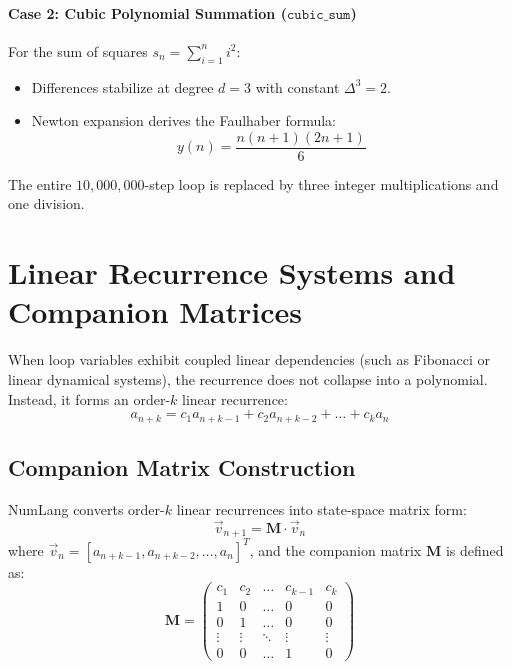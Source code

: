\paragraph{Case 2: Cubic Polynomial Summation ($\mathtt{cubic\_sum}$)}
For the sum of squares $s_n = \sum_{i=1}^n i^2$:
\begin{itemize}
    \item Differences stabilize at degree $d=3$ with constant $\Delta^3 = 2$.
    \item Newton expansion derives the Faulhaber formula:
    \begin{equation}
    y(n) = \frac{n(n+1)(2n+1)}{6}
    \end{equation}
\end{itemize}
The entire $10,000,000$-step loop is replaced by three integer multiplications and one division.

\section{Linear Recurrence Systems and Companion Matrices}
\label{sec:rec:companion_matrix}

When loop variables exhibit coupled linear dependencies (such as Fibonacci or linear dynamical systems), the recurrence does not collapse into a polynomial. Instead, it forms an order-$k$ linear recurrence:
\begin{equation}
a_{n+k} = c_1 a_{n+k-1} + c_2 a_{n+k-2} + \dots + c_k a_n
\end{equation}

\subsection{Companion Matrix Construction}
NumLang converts order-$k$ linear recurrences into state-space matrix form:
\begin{equation}
\vec{v}_{n+1} = \mathbf{M} \cdot \vec{v}_n
\end{equation}
where $\vec{v}_n = [a_{n+k-1}, a_{n+k-2}, \dots, a_n]^T$, and the companion matrix $\mathbf{M}$ is defined as:
\begin{equation}
\mathbf{M} = \begin{pmatrix}
c_1 & c_2 & \dots & c_{k-1} & c_k \\
1 & 0 & \dots & 0 & 0 \\
0 & 1 & \dots & 0 & 0 \\
\vdots & \vdots & \ddots & \vdots & \vdots \\
0 & 0 & \dots & 1 & 0
\end{pmatrix}
\end{equation}

